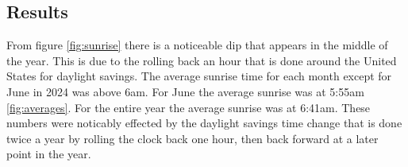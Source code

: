 \subsection{Results}
From figure \ref{fig:sunrise} there is a noticeable dip that appears in the middle of the year.
This is due to the rolling back an hour that is done around the United States for daylight savings.
The average sunrise time for each month except for June in 2024 was above 6am.
For June the average sunrise was at 5:55am \ref{fig:averages}.
For the entire year the average sunrise was at 6:41am.
These numbers were noticably effected by the daylight savings time change that is done twice a year by rolling the clock back one hour, then back forward at a later point in the year.
